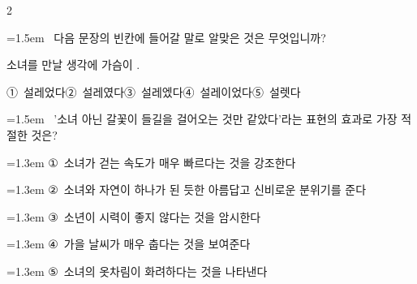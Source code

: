 \documentclass[11pt, a4paper]{article}
\begin{document}
\begin{multicols}{2}
\noindent\begin{minipage}{\columnwidth}
\vspace{2mm}
{\hangindent=1.5em  ~다음 문장의 빈칸에 들어갈 말로 알맞은 것은 무엇입니까?\par}

\vspace{1mm}
\begin{boxibox}
소녀를 만날 생각에 가슴이 \underline{\hspace{3cm}}. \\
\end{boxibox}
\vspace{1mm}

\vspace{0.5mm}
\noindent
\mbox{①~설레었다}\hspace{1em}\mbox{②~설레였다}\hspace{1em}\mbox{③~설레엤다}\hspace{1em}\mbox{④~설레이었다}\hspace{1em}\mbox{⑤~설렛다}

\vspace{4mm}
\end{minipage}
\par

\noindent\begin{minipage}{\columnwidth}
\vspace{2mm}
{\hangindent=1.5em  ~'소녀 아닌 갈꽃이 들길을 걸어오는 것만 같았다'라는 표현의 효과로 가장 적절한 것은?\par}

\vspace{0.5mm}
{\hangindent=1.3em  \noindent\hspace{0.3em}①~소녀가 걷는 속도가 매우 빠르다는 것을 강조한다\par}
{\hangindent=1.3em  \noindent\hspace{0.3em}②~소녀와 자연이 하나가 된 듯한 아름답고 신비로운 분위기를 준다\par}
{\hangindent=1.3em  \noindent\hspace{0.3em}③~소년이 시력이 좋지 않다는 것을 암시한다\par}
{\hangindent=1.3em  \noindent\hspace{0.3em}④~가을 날씨가 매우 춥다는 것을 보여준다\par}
{\hangindent=1.3em  \noindent\hspace{0.3em}⑤~소녀의 옷차림이 화려하다는 것을 나타낸다\par}
\vspace{4mm}
\end{minipage}
\par


\end{multicols}
\end{document}
